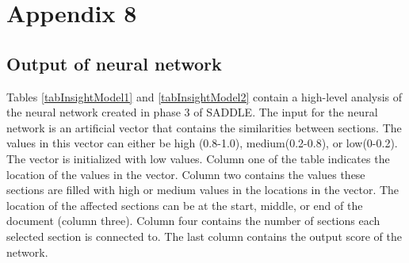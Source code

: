 \appendix 

\chapter{Appendix 8}
\section{Output of neural network}
\label{appendix:insightModel}

Tables \ref{tabInsightModel1} and  \ref{tabInsightModel2} contain a high-level analysis of the neural network created in phase 3 of SADDLE. The input for the neural network is an artificial vector that contains the similarities between sections. The values in this vector can either be high (0.8-1.0), medium(0.2-0.8), or low(0-0.2). The vector is initialized with low values. Column one of the table indicates the location of the values in the vector. Column two contains the values these sections are filled with high or medium values in the locations in the vector. The location of the affected sections can be at the start, middle, or end of the document (column three). Column four contains the number of sections each selected section is connected to. The last column contains the output score of the network. \\



